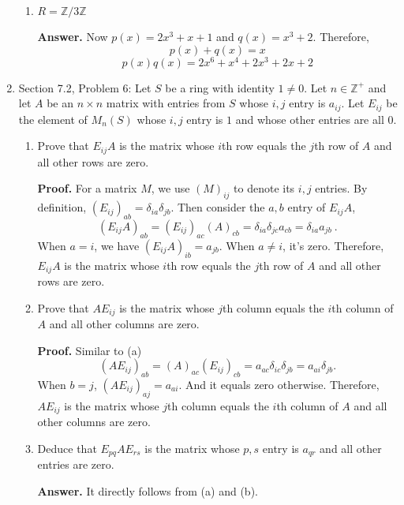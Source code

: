 \documentclass[12pt]{article}
\newcommand{\Z}{\mathbb{Z}}
\begin{document}
\begin{enumerate}
\begin{enumerate}
    \item $R = \Z / 3\Z$

    \smallskip
    {\bf Answer. }Now $p(x) = 2x^3 + x + 1$ and $q(x) = x^3 + 2$. Therefore,
    $$
    p(x) + q(x) = x
    $$
    $$
    p(x) q(x) = 2x^6 + x^4 + 2x^3 + 2x + 2
    $$
    \bigskip
\end{enumerate}
\item Section 7.2, Problem 6: Let $S$ be a ring with identity $1\neq0$. Let $n \in \Z^+$ and let $A$ be an $n \times n$ matrix with entries from $S$ whose $i,j$ entry is $a_{ij}$. Let $E_{ij}$ be the element of $M_n(S)$ whose $i,j$ entry is $1$ and whose other entries are all $0$.
\begin{enumerate}
    \item Prove that $E_{ij}A$ is the matrix whose $i$th row equals the $j$th row of $A$ and all other rows are zero.

    \smallskip
    {\bf Proof. }For a matrix $M$, we use $(M)_{ij}$ to denote its $i,j$ entries. By definition, $(E_{ij})_{ab} = \delta_{ia} \delta_{jb}$. Then consider the $a,b$ entry of $E_{ij}A$,
    $$
    (E_{ij}A)_{ab} = (E_{ij})_{ac} (A)_{cb} = \delta_{ia} \delta_{jc} a_{cb} = \delta_{ia} a_{jb}~.
    $$
    When $a = i$, we have $(E_{ij}A)_{ib} = a_{jb}$. When $a \neq i$, it's zero. Therefore, $E_{ij}A$ is the matrix whose $i$th row equals the $j$th row of $A$ and all other rows are zero.
    \bigskip

    \item Prove that $A E_{ij}$ is the matrix whose $j$th column equals the $i$th column of $A$ and all other columns are zero.

    \smallskip
    {\bf Proof. }Similar to (a)
    $$
    (AE_{ij})_{ab} = (A)_{ac} (E_{ij})_{cb} = a_{ac} \delta_{ic} \delta_{jb} = a_{ai} \delta_{jb}.
    $$
    When $b = j$, $(AE_{ij})_{aj} = a_{ai}$. And it equals zero otherwise. Therefore, $A E_{ij}$ is the matrix whose $j$th column equals the $i$th column of $A$ and all other columns are zero.
    \bigskip

    \item Deduce that $E_{pq} A E_{rs}$ is the matrix whose $p,s$ entry is $a_{qr}$ and all other entries are zero.

    \smallskip
    {\bf Answer. }It directly follows from (a) and (b).
    \bigskip
\end{enumerate}
\end{enumerate}
\end{document}

